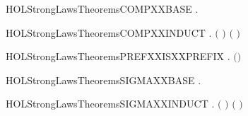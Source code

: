\newcommand{\HOLStrongLawsTheoremsCCSXXSIGMAXXcompute}{\UseVerbatim{HOLStrongLawsTheoremsCCSXXSIGMAXXcompute}}
\begin{SaveVerbatim}{HOLStrongLawsTheoremsCOMPXXBASE}
\HOLTokenTurnstile{} \HOLSymConst{\HOLTokenForall{}}.    \HOLSymConst{\ensuremath{=}}  
\end{SaveVerbatim}
\newcommand{\HOLStrongLawsTheoremsCOMPXXBASE}{\UseVerbatim{HOLStrongLawsTheoremsCOMPXXBASE}}
\begin{SaveVerbatim}{HOLStrongLawsTheoremsCOMPXXINDUCT}
\HOLTokenTurnstile{} \HOLSymConst{\HOLTokenForall{}} .   \ensuremath{(} \ensuremath{)} \HOLSymConst{\ensuremath{=}}    \HOLSymConst{\ensuremath{\mid}}  \ensuremath{(} \ensuremath{)}
\end{SaveVerbatim}
\newcommand{\HOLStrongLawsTheoremsCOMPXXINDUCT}{\UseVerbatim{HOLStrongLawsTheoremsCOMPXXINDUCT}}
\begin{SaveVerbatim}{HOLStrongLawsTheoremsPREFXXISXXPREFIX}
\HOLTokenTurnstile{} \HOLSymConst{\HOLTokenForall{}} .  \ensuremath{(}\HOLSymConst{\ensuremath{\ldotp}}\ensuremath{)}
\end{SaveVerbatim}
\newcommand{\HOLStrongLawsTheoremsPREFXXISXXPREFIX}{\UseVerbatim{HOLStrongLawsTheoremsPREFXXISXXPREFIX}}
\begin{SaveVerbatim}{HOLStrongLawsTheoremsSIGMAXXBASE}
\HOLTokenTurnstile{} \HOLSymConst{\HOLTokenForall{}}.    \HOLSymConst{\ensuremath{=}}  
\end{SaveVerbatim}
\newcommand{\HOLStrongLawsTheoremsSIGMAXXBASE}{\UseVerbatim{HOLStrongLawsTheoremsSIGMAXXBASE}}
\begin{SaveVerbatim}{HOLStrongLawsTheoremsSIGMAXXINDUCT}
\HOLTokenTurnstile{} \HOLSymConst{\HOLTokenForall{}} .   \ensuremath{(} \ensuremath{)} \HOLSymConst{\ensuremath{=}}    \HOLSymConst{\ensuremath{+}}  \ensuremath{(} \ensuremath{)}
\end{SaveVerbatim}
\newcommand{\HOLStrongLawsTheoremsSIGMAXXINDUCT}{\UseVerbatim{HOLStrongLawsTheoremsSIGMAXXINDUCT}}
